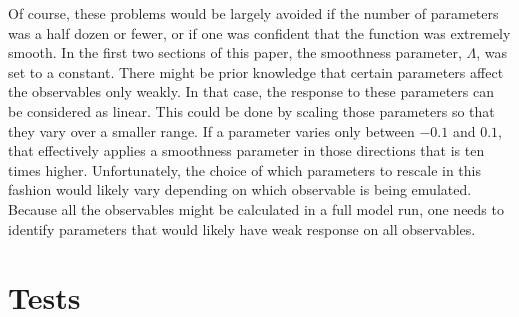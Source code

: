 \documentclass[12pt]{article}
\numberwithin{equation}{section}
\numberwithin{figure}{section}
\begin{document}
Of course, these problems would be largely avoided if the number of parameters was a half dozen or fewer, or if one was confident that the function was extremely smooth. In the first two sections of this paper, the smoothness parameter, $\Lambda$, was set to a constant. There might be prior knowledge that certain parameters affect the observables only weakly. In that case, the response to these parameters can be considered as linear. This could be done by scaling those parameters so that they vary over a smaller range. If a parameter varies only between $-0.1$ and $0.1$, that effectively applies a smoothness parameter in those directions that is ten times higher. Unfortunately, the choice of which parameters to rescale in this fashion would likely vary depending on which observable is being emulated. Because all the observables might be calculated in a full model run, one needs to identify parameters that would likely have weak response on all observables. 

\section{Tests}
\end{document}
